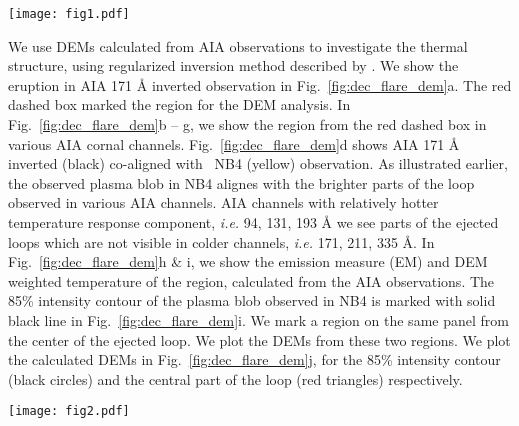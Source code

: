 \begin{figure*}[ht!]
    \centering
    \texttt{[image: fig1.pdf]}
    \caption{Sequence of coaligned AIA 1600 {\AA} (black-green) and {\suit} NB4 (yellow) observations. We see the erupting loop and parts of the dense loops are co-spatial with the ejecta observed in {\suit} NB4 observations. An animated version of this sequence is available in the online version of the journal.}
    \label{fig:dec_flare_obs}
\end{figure*}

We use DEMs calculated from AIA observations to investigate the thermal structure, using regularized inversion method described by \cite{hannah&kontar12}. We show the eruption in AIA 171 {\AA} inverted observation in Fig.~\ref{fig:dec_flare_dem}a. The red dashed box marked the region for the DEM analysis. In Fig.~\ref{fig:dec_flare_dem}b {--} g, we show the region from the red dashed box in various AIA cornal channels. Fig.~\ref{fig:dec_flare_dem}d shows AIA 171 {\AA} inverted (black) co-aligned with \suit~NB4 (yellow) observation. As illustrated earlier, the observed plasma blob in NB4 alignes with the brighter parts of the loop observed in various AIA channels. AIA channels with relatively hotter temperature response component, {\it i.e.} 94, 131, 193 {\AA} we see parts of the ejected loops which are not visible in colder channels, {\it i.e.} 171, 211, 335 {\AA}. In Fig.~\ref{fig:dec_flare_dem}h \& i, we show the emission measure (EM) and DEM weighted temperature of the region, calculated from the AIA observations. The 85\% intensity contour of the plasma blob observed in NB4 is marked with solid black line in Fig.~\ref{fig:dec_flare_dem}i. We mark a region on the same panel from the center of the ejected loop. We plot the DEMs from these two regions. We plot the calculated DEMs in Fig.~\ref{fig:dec_flare_dem}j, for the 85\% intensity contour (black circles) and the central part of the loop (red triangles) respectively. 

\begin{figure*}[ht!]
    \centering
    \texttt{[image: fig2.pdf]}
    \caption{(a) Inverted AIA 171 {\AA} observation during the ejection of the loop. Red dashed box marks the region considered for the DEM analysis. (b) {--} (g)  AIA observation in 94, 131, 171, 193, 211, and 335 {\AA} of the red dashed region respectively. The inverted 171 {\AA} observation (panel d) is overplotted on co-aligned \suit~NB4 observation (yellow). (h) Calculated EM from the AIA observations. (i) Calculated DEM weighted temperature from the AIA observations. The 85\% intensity contour of the \suit~NB4 blob is marked with solid black line. The dashed black line marks the central part of the loop. (j) The DEM from solid black contour and dashed black contour are plotted with black circles and red triangles respectively.}
    \label{fig:dec_flare_dem}
\end{figure*}

